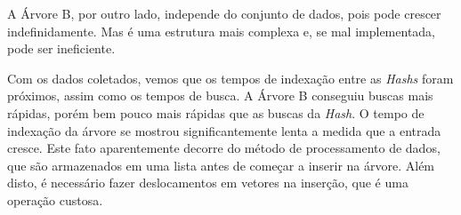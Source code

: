 \documentclass[
	11pt,				%
	oneside,			%
	a4paper,			%
	english,			%
	brazil,				%
	]{article}
\begin{document}
A Árvore B, por outro lado, independe do conjunto de dados, pois pode crescer indefinidamente. Mas é uma estrutura mais complexa e, se mal implementada, pode ser ineficiente.

Com os dados coletados, vemos que os tempos de indexação entre as \textit{Hashs} foram próximos, assim como os tempos de busca. A Árvore B conseguiu buscas mais rápidas, porém bem pouco mais rápidas que as buscas da \textit{Hash}. O tempo de indexação da árvore se mostrou significantemente lenta a medida que a entrada cresce. Este fato aparentemente decorre do método de processamento de dados, que são armazenados em uma lista antes de começar a inserir na árvore. Além disto, é necessário fazer deslocamentos em vetores na inserção, que é uma operação custosa.

{}

\end{document}
